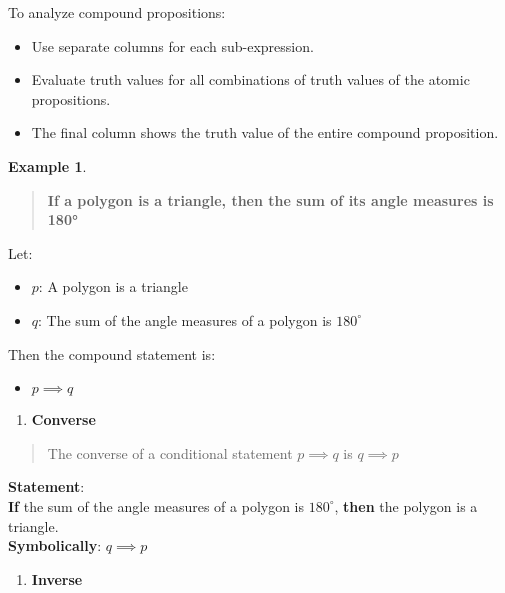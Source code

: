 \documentclass[
]{book}
\providecommand{\tightlist}{%
  \setlength{\itemsep}{0pt}\setlength{\parskip}{0pt}}
\theoremstyle{definition}
\theoremstyle{definition}
\newtheorem{example}{Example}[chapter]
\theoremstyle{definition}
\theoremstyle{definition}
\theoremstyle{remark}
\begin{document}
To analyze compound propositions:

\begin{itemize}
\tightlist
\item
  Use separate columns for each sub-expression.
\item
  Evaluate truth values for all combinations of truth values of the atomic propositions.
\item
  The final column shows the truth value of the entire compound proposition.
\end{itemize}

\begin{example}
\protect\hypertarget{exm:unnamed-chunk-29}{}\label{exm:unnamed-chunk-29}\leavevmode

\begin{quote}
\textbf{If a polygon is a triangle, then the sum of its angle measures is 180°}
\end{quote}

Let:

\begin{itemize}
\tightlist
\item
  \(p\): A polygon is a triangle\\
\item
  \(q\): The sum of the angle measures of a polygon is \(180^\circ\)
\end{itemize}

Then the compound statement is:

\begin{itemize}
\tightlist
\item
  \(p \implies q\)
\end{itemize}

\begin{enumerate}
\def\labelenumi{(\roman{enumi})}
\setcounter{enumi}{1}
\tightlist
\item
  \textbf{Converse}
\end{enumerate}

\begin{quote}
The converse of a conditional statement \(p \implies q\) is \(q \implies p\)
\end{quote}

\textbf{Statement}:\\
\textbf{If} the sum of the angle measures of a polygon is \(180^\circ\), \textbf{then} the polygon is a triangle.\\
\textbf{Symbolically}: \(q \implies p\)

\begin{enumerate}
\def\labelenumi{(\roman{enumi})}
\setcounter{enumi}{2}
\tightlist
\item
  \textbf{Inverse}
\end{enumerate}


\end{example}
\end{document}
